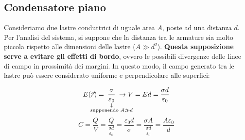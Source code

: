 \documentclass{book}
\begin{document}
\subsection{Condensatore piano}
Consideriamo due lastre conduttrici di uguale area $A$, poste ad una distanza $d$. Per l'analisi del sistema, si suppone che la distanza tra le armature sia molto piccola rispetto alle dimensioni delle lastre ($A \gg d^2$). 
\textbf{Questa supposizione serve a evitare gli effetti di bordo}, ovvero le possibili divergenze delle linee di campo in prossimità dei margini. In questo modo, il campo generato tra le lastre può essere considerato uniforme e perpendicolare alle superfici:

\[
\displaystyle E(\vec{r})= \hspace{- 0.8cm}\underset{\substack{\downarrow \\ \text{supponendo } A \gg d}}{\frac{\sigma}{\varepsilon_0}} \hspace{- 0.8cm} \rightarrow V=Ed=\frac{\sigma d}{\varepsilon_0}
\]
\[
C=\frac{Q}{V}=\frac{Q}{\frac{\sigma d}{\varepsilon_0}}=\frac{\varepsilon_0 d}{\sigma}=\frac{\sigma A}{\frac{\sigma d }{\varepsilon_0}}=\frac{A \varepsilon_0}{d}
\]
\begin{center}
\end{center}
\end{document}

